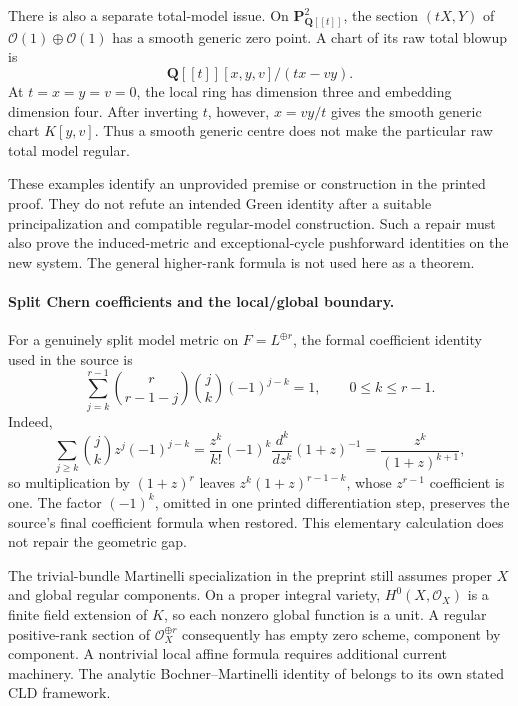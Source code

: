 There is also a separate total-model issue. On
\(\mathbf P^2_{\mathbf Q[[t]]}\), the section \((tX,Y)\) of
\(\mathcal O(1)\oplus\mathcal O(1)\) has a smooth generic zero point.
A chart of its raw total blowup is
\[
 \mathbf Q[[t]][x,y,v]/(tx-vy).
\]
At \(t=x=y=v=0\), the local ring has dimension three and embedding
dimension four. After inverting \(t\), however, \(x=vy/t\) gives
the smooth generic chart \(K[y,v]\). Thus a smooth generic centre
does not make the particular raw total model regular.

These examples identify an unprovided premise or construction in the
printed proof. They do not refute an intended Green identity after
a suitable principalization and compatible regular-model construction.
Such a repair must also prove the induced-metric and exceptional-cycle
pushforward identities on the new system. The general higher-rank
formula is not used here as a theorem.

\paragraph{Split Chern coefficients and the local/global boundary.}
For a genuinely split model metric on \(F=L^{\oplus r}\), the
formal coefficient identity used in the source is
\[
 \sum_{j=k}^{r-1}
 \binom r{r-1-j}\binom jk(-1)^{j-k}=1,
 \qquad 0\leq k\leq r-1.
\]
Indeed,
\[
 \sum_{j\geq k}\binom jk z^j(-1)^{j-k}
 =\frac{z^k}{k!}(-1)^k
   \frac{d^k}{dz^k}(1+z)^{-1}
 =\frac{z^k}{(1+z)^{k+1}},
\]
so multiplication by \((1+z)^r\) leaves
\(z^k(1+z)^{r-1-k}\), whose \(z^{r-1}\) coefficient is one.
The factor \((-1)^k\), omitted in one printed differentiation
step, preserves the source's final coefficient formula when restored.
This elementary calculation does not repair the geometric gap.

The trivial-bundle Martinelli specialization in the preprint still
assumes proper \(X\) and global regular components. On a proper
integral variety, \(H^0(X,\mathcal O_X)\) is a finite field extension
of \(K\), so each nonzero global function is a unit. A regular
positive-rank section of \(\mathcal O_X^{\oplus r}\) consequently
has empty zero scheme, component by component.
A nontrivial local affine formula requires additional current
machinery. The analytic Bochner--Martinelli identity of
 belongs to its own stated CLD
framework.

